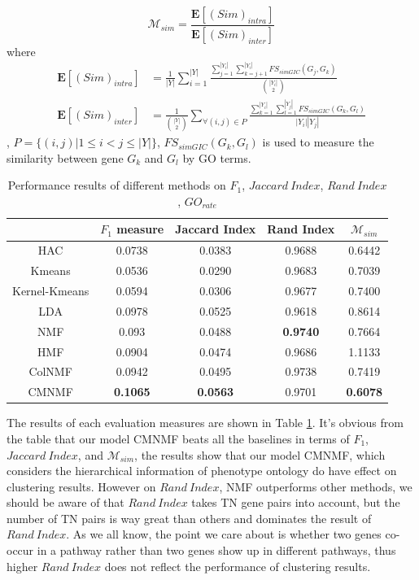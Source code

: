 \documentclass{bmcart}
\begin{document}
$$
\mathcal{M}_{sim} = \frac{\bm{E}[(Sim)_{intra}]}{\bm{E}[(Sim)_{inter}]}
$$
where
\begin{equation}\label{}\nonumber
\begin{split}
\bm{E}[(Sim)_{intra}]&=\frac{1}{|Y|}\sum_{i=1}^{|Y|}
\frac{\sum_{j=1}^{|Y_i|}\sum_{k=j+1}^{|Y_i|}FS_{simGIC}(G_j,G_k)}{{|Y_i|\choose 2}}\\
\bm{E}[(Sim)_{inter}]&=\frac{1}{{|Y|\choose 2}}\sum_{\forall(i,j)\in P}
\frac{\sum_{k=1}^{|Y_i|}\sum_{l=1}^{|Y_j|}FS_{simGIC}(G_k,G_l)}{|Y_i||Y_j|}
\end{split}
\end{equation}
,
$P=\{(i,j)|1\leq i< j\leq|Y|\}$, $FS_{simGIC}(G_k,G_l)$ \cite{Teng2013} is used to measure the similarity between gene $G_k$ and $G_l$ by GO terms.
\begin{table}[!t]
\centering
\caption{Performance results of different methods on $F_1$, $Jaccard\ Index$, $Rand\ Index$, $GO_{rate}$}\label{tab:measurements}
\begin{tabular}{c|cccc}
\hline
&$F_1$ measure &Jaccard Index& Rand Index&$\mathcal{M}_{sim}$\\
\hline
HAC&0.0738&0.0383&0.9688&0.6442\\
Kmeans&0.0536&0.0290&0.9683&0.7039\\
Kernel-Kmeans&0.0594&0.0306&0.9677&0.7400\\
LDA&0.0978&0.0525&0.9618&0.8614\\
NMF&0.093&0.0488&\textbf{0.9740}&0.7664\\
HMF&0.0904&0.0474&0.9686&1.1133\\
ColNMF&0.0942&0.0495&0.9738&0.7419\\
CMNMF&\textbf{0.1065}& \textbf{0.0563}&{0.9701}& \textbf{0.6078}\\
\hline
\end{tabular}
\end{table}

The results of each evaluation measures are shown in Table \ref{tab:measurements}.
It's obvious from the table that our model CMNMF beats all the baselines in terms of $F_1$, $Jaccard\ Index$, and $\mathcal{M}_{sim}$, the results show that our model CMNMF, which considers the hierarchical information of phenotype ontology do have effect on clustering results. However on $Rand\ Index$, NMF outperforms other methods, we should be aware of that $Rand\ Index$ takes TN gene pairs into account, but the number of TN pairs is way great than others and dominates the result of $Rand\ Index$. As we all know, the point we care about is whether two genes co-occur in a pathway rather than two genes show up in different pathways, thus higher $Rand\ Index$ does not reflect the performance of clustering results.
\end{document}
